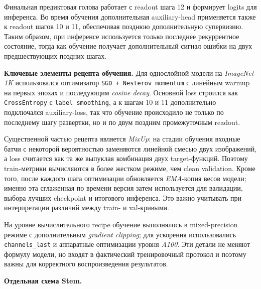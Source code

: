 \documentclass[11pt,landscape]{article}
\begin{document}
\medskip

\noindent
Финальная предиктовая голова работает с readout шага 12 и формирует logits для инференса. Во время обучения дополнительная auxiliary-head применяется также к readout шагов 10 и 11, обеспечивая позднюю дополнительную супервизию. Таким образом, при инференсе используется только последнее рекуррентное состояние, тогда как обучение получает дополнительный сигнал ошибки на двух предшествующих поздних шагах.

\vspace{5mm}

\noindent\textbf{Ключевые элементы рецепта обучения.}
Для однослойной модели на \textit{ImageNet-1K} использовался оптимизатор \texttt{SGD + Nesterov momentum} с линейным warmup на первых эпохах и последующим \textit{cosine decay}. Основной loss строился как \texttt{CrossEntropy} с \texttt{label smoothing}, а к шагам 10 и 11 дополнительно подключался auxiliary-loss, так что обучение происходило не только по последнему шагу развертки, но и по двум поздним промежуточным readout.

\medskip

\noindent
Существенной частью рецепта является \textit{MixUp}: на стадии обучения входные батчи с некоторой вероятностью заменяются линейной смесью двух изображений, а loss считается как та же выпуклая комбинация двух target-функций. Поэтому train-метрики вычисляются в более жестком режиме, чем clean validation. Кроме того, после каждого шага оптимизации обновляется \textit{EMA}-копия весов модели; именно эта сглаженная по времени версия затем используется для валидации, выбора лучших checkpoint и итогового инференса. Это важно учитывать при интерпретации различий между train- и val-кривыми.

\medskip

\noindent
На уровне вычислительного recipe обучение выполнялось в mixed-precision режиме с дополнительным \textit{gradient clipping}; для ускорения использовались \texttt{channels\_last} и аппаратные оптимизации уровня \textit{A100}. Эти детали не меняют формулу модели, но входят в фактический тренировочный протокол и поэтому важны для корректного воспроизведения результатов.

\vspace{5mm}

\noindent\textbf{Отдельная схема Stem.}

\vspace{2mm}
\end{document}
